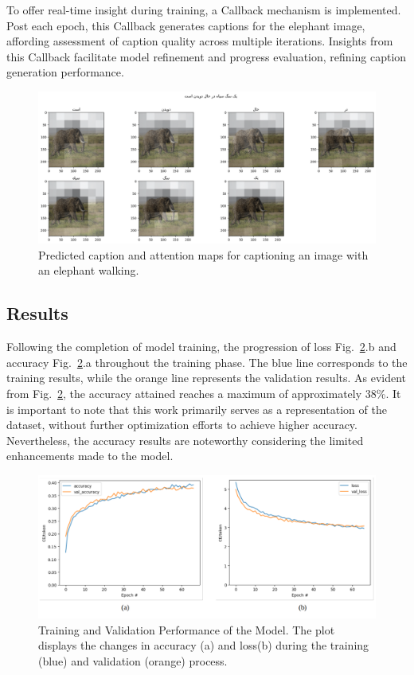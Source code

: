 \documentclass[lettersize,journal]{IEEEtran}
\begin{document}
To offer real-time insight during training, a Callback mechanism is implemented. Post each epoch, this Callback generates captions for the elephant image, affording assessment of caption quality across multiple iterations. Insights from this Callback facilitate model refinement and progress evaluation, refining caption generation performance.

\begin{figure}
  \includegraphics[width=\textwidth]{elephant.png}
  \caption{Predicted caption and attention maps for captioning an image with an elephant walking.}
  \label{fig5}
\end{figure}

\subsection{Results}

Following the completion of model training, the progression of loss Fig.~\ref{fig4}.b and accuracy  Fig.~\ref{fig4}.a throughout the training phase. The blue line corresponds to the training results, while the orange line represents the validation results.
As evident from Fig.~\ref{fig4}, the accuracy attained reaches a maximum of approximately 38\%. It is important to note that this work primarily serves as a representation of the dataset, without further optimization efforts to achieve higher accuracy. Nevertheless, the accuracy results are noteworthy considering the limited enhancements made to the model.

\begin{figure}
  \includegraphics[width=\columnwidth]{loss.png}
  \caption{Training and Validation Performance of the Model. The plot displays the changes in accuracy (a) and loss(b) during the training (blue) and validation (orange) process.} \label{fig4}
\end{figure}
\end{document}
